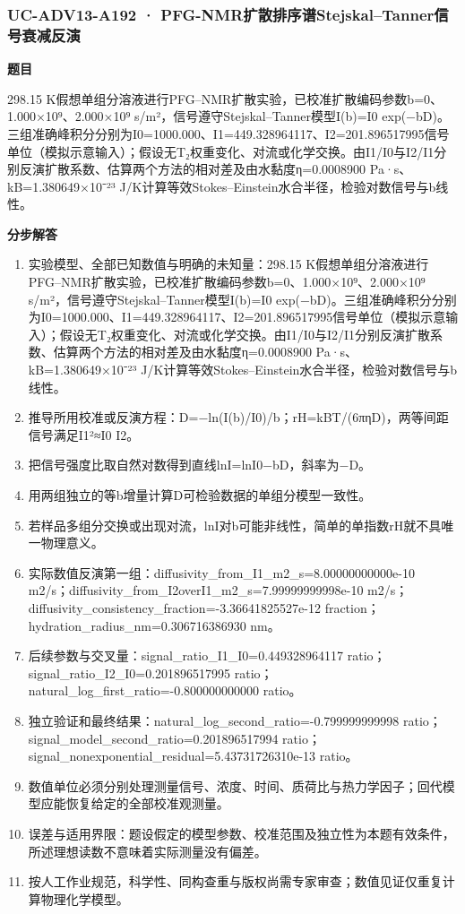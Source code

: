 \documentclass[UTF8,11pt,a4paper]{ctexart}
\begin{document}
\subsubsection*{UC-ADV13-A192 · PFG-NMR扩散排序谱Stejskal–Tanner信号衰减反演}
\noindent\textbf{题目}\par
298.15 K假想单组分溶液进行PFG–NMR扩散实验，已校准扩散编码参数b=0、1.000×10⁹、2.000×10⁹ s/m²，信号遵守Stejskal–Tanner模型I(b)=I0 exp(−bD)。三组准确峰积分分别为I0=1000.000、I1=449.328964117、I2=201.896517995信号单位（模拟示意输入）；假设无T₂权重变化、对流或化学交换。由I1/I0与I2/I1分别反演扩散系数、估算两个方法的相对差及由水黏度η=0.0008900 Pa·s、kB=1.380649×10⁻²³ J/K计算等效Stokes–Einstein水合半径，检验对数信号与b线性。\par
\medskip\noindent\textbf{分步解答}
\begin{enumerate}
\item 实验模型、全部已知数值与明确的未知量：298.15 K假想单组分溶液进行PFG–NMR扩散实验，已校准扩散编码参数b=0、1.000×10⁹、2.000×10⁹ s/m²，信号遵守Stejskal–Tanner模型I(b)=I0 exp(−bD)。三组准确峰积分分别为I0=1000.000、I1=449.328964117、I2=201.896517995信号单位（模拟示意输入）；假设无T₂权重变化、对流或化学交换。由I1/I0与I2/I1分别反演扩散系数、估算两个方法的相对差及由水黏度η=0.0008900 Pa·s、kB=1.380649×10⁻²³ J/K计算等效Stokes–Einstein水合半径，检验对数信号与b线性。
\item 推导所用校准或反演方程：D=−ln(I(b)/I0)/b；rH=kBT/(6πηD)，两等间距信号满足I1²≈I0 I2。
\item 把信号强度比取自然对数得到直线lnI=lnI0−bD，斜率为−D。
\item 用两组独立的等b增量计算D可检验数据的单组分模型一致性。
\item 若样品多组分交换或出现对流，lnI对b可能非线性，简单的单指数rH就不具唯一物理意义。
\item 实际数值反演第一组：diffusivity\_from\_I1\_m2\_s=8.00000000000e-10 m2/s；diffusivity\_from\_I2overI1\_m2\_s=7.99999999998e-10 m2/s；diffusivity\_consistency\_fraction=-3.36641825527e-12 fraction；hydration\_radius\_nm=0.306716386930 nm。
\item 后续参数与交叉量：signal\_ratio\_I1\_I0=0.449328964117 ratio；signal\_ratio\_I2\_I0=0.201896517995 ratio；natural\_log\_first\_ratio=-0.800000000000 ratio。
\item 独立验证和最终结果：natural\_log\_second\_ratio=-0.799999999998 ratio；signal\_model\_second\_ratio=0.201896517994 ratio；signal\_nonexponential\_residual=5.43731726310e-13 ratio。
\item 数值单位必须分别处理测量信号、浓度、时间、质荷比与热力学因子；回代模型应能恢复给定的全部校准观测量。
\item 误差与适用界限：题设假定的模型参数、校准范围及独立性为本题有效条件，所述理想读数不意味着实际测量没有偏差。
\item 按人工作业规范，科学性、同构查重与版权尚需专家审查；数值见证仅重复计算物理化学模型。
\end{enumerate}
\end{document}
